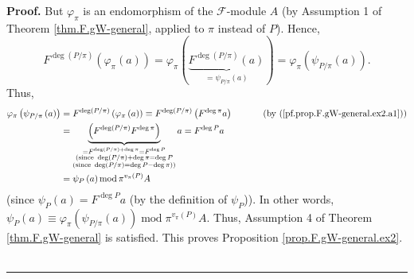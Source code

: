 \documentclass[numbers=enddot,12pt,final,onecolumn,notitlepage]{scrartcl}%
\theoremstyle{definition}
\newenvironment{proof}[1][Proof]{\noindent\textbf{#1.} }{\ \rule{0.5em}{0.5em}}
\begin{document}
\begin{proof}
But $\varphi_{\pi}$ is an endomorphism of the $\mathcal{F}$-module $A$ (by
Assumption 1 of Theorem \ref{thm.F.gW-general}, applied to $\pi$ instead of
$P$). Hence,%
\[
F^{\deg\left(  P/\pi\right)  }\left(  \varphi_{\pi}\left(  a\right)  \right)
=\varphi_{\pi}\left(  \underbrace{F^{\deg\left(  P/\pi\right)  }\left(
a\right)  }_{=\psi_{P/\pi}\left(  a\right)  }\right)  =\varphi_{\pi}\left(
\psi_{P/\pi}\left(  a\right)  \right)  .
\]
Thus,%
\begin{align*}
\varphi_{\pi}\left(  \psi_{P/\pi}\left(  a\right)  \right)   &  =F^{\deg
\left(  P/\pi\right)  }\left(  \varphi_{\pi}\left(  a\right)  \right)  \equiv
F^{\deg\left(  P/\pi\right)  }\left(  F^{\deg\pi}a\right)
\ \ \ \ \ \ \ \ \ \ \left(  \text{by (\ref{pf.prop.F.gW-general.ex2.a1}%
)}\right) \\
&  =\underbrace{\left(  F^{\deg\left(  P/\pi\right)  }F^{\deg\pi}\right)
}_{\substack{=F^{\deg\left(  P/\pi\right)  +\deg\pi}=F^{\deg P}\\\text{(since
}\deg\left(  P/\pi\right)  +\deg\pi=\deg P\\\text{(since }\deg\left(
P/\pi\right)  =\deg P-\deg\pi\text{))}}}a=F^{\deg P}a\\
&  =\psi_{P}\left(  a\right)  \operatorname{mod}\pi^{v_{\pi}\left(  P\right)
}A
\end{align*}
(since $\psi_{P}\left(  a\right)  =F^{\deg P}a$ (by the definition of
$\psi_{P}$)). In other words, $\psi_{P}\left(  a\right)  \equiv\varphi_{\pi
}\left(  \psi_{P/\pi}\left(  a\right)  \right)  \operatorname{mod}\pi^{v_{\pi
}\left(  P\right)  }A$. Thus, Assumption 4 of Theorem \ref{thm.F.gW-general}
is satisfied. This proves Proposition \ref{prop.F.gW-general.ex2}.
\end{proof}
\end{document}
